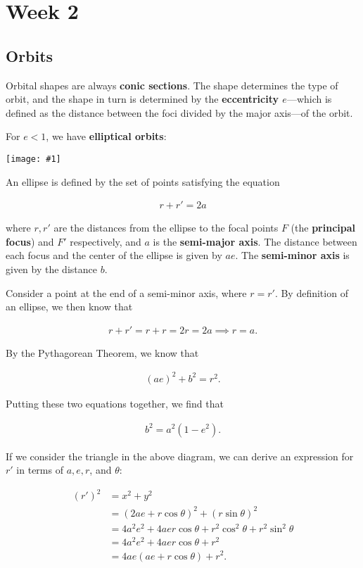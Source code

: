 \documentclass[a4paper,10pt]{article}
\newcommand{\fig}[1]{\centerline{\texttt{[image: \#1]}}}
\begin{document}
\newpage
\section{Week 2}

\subsection{Orbits}

Orbital shapes are always \textbf{conic sections}. The shape determines the type of orbit, and the shape in turn is determined by the \textbf{eccentricity $e$}—which is defined as the distance between the foci divided by the major axis—of the orbit. 

For $e<1$, we have \textbf{elliptical orbits}:

\fig{ellipse}

An ellipse is defined by the set of points satisfying the equation

\begin{align*}
    r + r' = 2a
\end{align*}

where $r, r'$ are the distances from the ellipse to the focal points $F$ (the \textbf{principal focus}) and $F'$ respectively, and $a$ is the \textbf{semi-major axis}. The distance between each focus and the center of the ellipse is given by $ae$. The \textbf{semi-minor axis} is given by the distance $b$. 

Consider a point at the end of a semi-minor axis, where $r=r'$. By definition of an ellipse, we then know that 

\begin{align*}
    r+r'=r+r=2r=2a
    \implies r=a.
\end{align*}

By the Pythagorean Theorem, we know that 

\begin{align*}
    (ae)^2 + b^2 = r^2.
\end{align*}

Putting these two equations together, we find that 

\begin{align*}
    b^2 = a^2(1-e^2).
\end{align*}

If we consider the triangle in the above diagram, we can derive an expression for $r'$ in terms of $a, e, r$, and $\theta$:

\begin{align*}
    (r')^2 &= x^2 + y^2 \\
           &= (2ae + r\cos\theta)^2 + (r\sin\theta)^2 \\
           &= 4a^2e^2 + 4aer\cos\theta + r^2\cos^2\theta + r^2\sin^2\theta \\
           &= 4a^2e^2 + 4aer\cos\theta + r^2 \\
           &= 4ae(ae + r\cos\theta) + r^2.
\end{align*}
\end{document}
